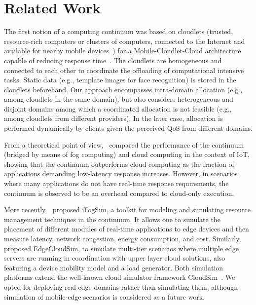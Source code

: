 \section{Related Work}
\label{sec:related}

The first notion of a computing continuum was based on cloudlets (trusted, resource-rich computers or clusters of computers, connected to the Internet and available for nearby mobile devices~\cite{Satyanarayanan09cloudlets}) for a Mobile-Cloudlet-Cloud architecture capable of reducing response time~\cite{Soyata:2012}. The cloudlets are homogeneous and connected to each other to coordinate the offloading of computational intensive tasks. Static data (e.g., template images for face recognition) is stored in the cloudlets beforehand. Our approach encompasses intra-domain allocation (e.g., among cloudlets in the same domain), but also considers heterogeneous and disjoint domains among which a coordinated allocation is not feasible (e.g., among cloudlets from different providers). In the later case, allocation is performed dynamically by clients given the perceived QoS from different domains.

From a theoretical point of view,~\cite{sarkar2015assessment} compared the performance of the continuum (bridged by means of fog computing) and cloud computing in the context of IoT, showing that the continuum outperforms cloud computing as the fraction of applications demanding low-latency response increases. However, in scenarios where many applications do not have real-time response requirements, the continuum is observed to be an overhead compared to cloud-only execution.

More recently,~\cite{GuptaIfogSim17} proposed iFogSim, a toolkit for modeling and simulating resource management techniques in the continuum. It allows one to simulate the placement of different modules of real-time applications to edge devices and then measure latency, network congestion, energy consumption, and cost. Similarly,~\cite{SonmezEgdeCloudSim17} proposed EdgeCloudSim, to simulate multi-tier scenarios where multiple edge servers are running in coordination with upper layer cloud solutions, also featuring a device mobility model and a load generator. Both simulation platforms extend the well-known cloud simulator framework CloudSim~\cite{calheiros2011cloudsim}. We opted for deploying real edge domains rather than simulating them, although simulation of mobile-edge scenarios is considered as a future work.

